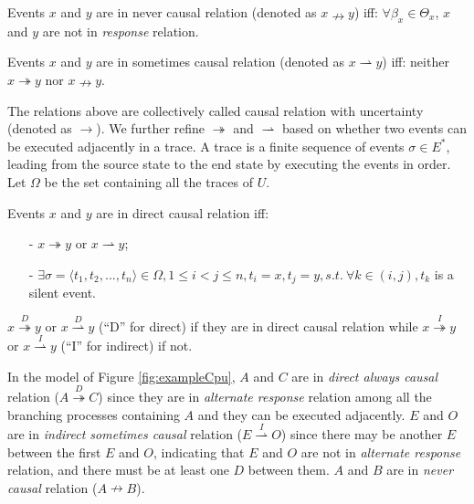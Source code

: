 \documentclass{llncs}
\begin{document}
\begin{definition}\label{def:neverCausal}
Events $x$ and $y$ are in never causal relation (denoted as $x\nrightarrow y$) iff: $\forall\beta_{x}\in\Theta_{x}$, $x$ and $y$ are not in \textit{response} relation.
\end{definition}

\begin{definition}\label{def:sometimesCausal}
Events $x$ and $y$ are in sometimes causal relation (denoted as $x\rightharpoonup y$) iff: neither $x\twoheadrightarrow y$ nor $x\nrightarrow y$.
\end{definition}

The relations above are collectively called causal relation with uncertainty (denoted as $\rightarrow$). We further refine $\twoheadrightarrow$ and $\rightharpoonup$ based on whether two events can be executed adjacently in a trace. A trace is a finite sequence of events $\sigma\in E^{*}$, leading from the source state to the end state by executing the events in order. Let $\Omega$ be the set containing all the traces of $U$.

\begin{definition}\label{def:sda}
Events $x$ and $y$ are in direct causal relation iff:
	\begin{itemize}
		\item[-] $x\twoheadrightarrow y$ or $x\rightharpoonup y$;
		\item[-] $\exists\sigma=\langle t_{1},t_{2},...,t_{n}\rangle\in\Omega,1\leq i<j\leq n,t_{i}=x,t_{j}=y,s.t.~\forall k\in(i,j),t_{k}$ is a silent event.
	\end{itemize}
	$x\overset{D}{\twoheadrightarrow}y$ or $x\overset{D}{\rightharpoonup}y$ (``D'' for direct) if they are in direct causal relation while $x\overset{I}{\twoheadrightarrow}y$ or $x\overset{I}{\rightharpoonup}y$ (``I'' for indirect) if not.
\end{definition}

\begin{example}\label{ex:causalRelation}
In the model of Figure \ref{fig:exampleCpu}, $A$ and $C$ are in \textit{direct always causal} relation ($A\overset{D}{\twoheadrightarrow}C$) since they are in \textit{alternate response} relation among all the branching processes containing $A$ and they can be executed adjacently. $E$ and $O$ are in \textit{indirect sometimes causal} relation ($E\overset{I}{\rightharpoonup}O$) since there may be another $E$ between the first $E$ and $O$, indicating that $E$ and $O$ are not in \textit{alternate response} relation, and there must be at least one $D$ between them. $A$ and $B$ are in \textit{never causal} relation ($A\nrightarrow B$).
\end{example}
\end{document}
